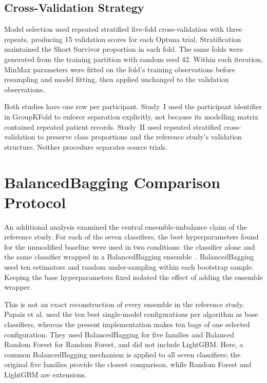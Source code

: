 \subsection{Cross-Validation Strategy}
\label{subsec:s2_cv}

Model selection used repeated stratified five-fold cross-validation with three repeats, producing 15 validation scores for each Optuna trial. Stratification maintained the Short Survivor proportion in each fold. The same folds were generated from the training partition with random seed 42. Within each iteration, MinMax parameters were fitted on the fold's training observations before resampling and model fitting, then applied unchanged to the validation observations.

Both studies have one row per participant. Study~I used the participant identifier in GroupKFold to enforce separation explicitly, not because its modelling matrix contained repeated patient records. Study~II used repeated stratified cross-validation to preserve class proportions and the reference study's validation structure. Neither procedure separates source trials.

\section{BalancedBagging Comparison Protocol}
\label{sec:s2_bagging}

An additional analysis examined the central ensemble-imbalance claim of the reference study. For each of the seven classifiers, the best hyperparameters found for the unmodified baseline were used in two conditions: the classifier alone and the same classifier wrapped in a BalancedBagging ensemble~\cite{lemaitre2017}. BalancedBagging used ten estimators and random under-sampling within each bootstrap sample. Keeping the base hyperparameters fixed isolated the effect of adding the ensemble wrapper.

This is not an exact reconstruction of every ensemble in the reference study. Papaiz et al. used the ten best single-model configurations per algorithm as base classifiers, whereas the present implementation makes ten bags of one selected configuration. They used BalancedBagging for five families and Balanced Random Forest for Random Forest, and did not include LightGBM. Here, a common BalancedBagging mechanism is applied to all seven classifiers; the original five families provide the closest comparison, while Random Forest and LightGBM are extensions.


